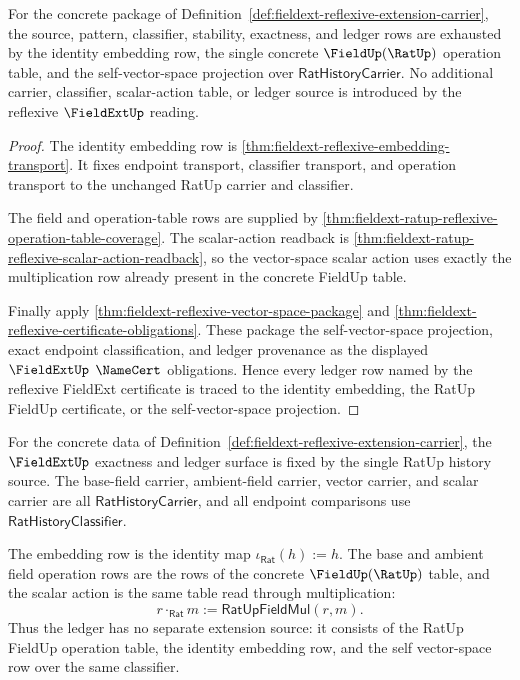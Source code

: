 \begin{theorem}
\label{thm:fieldext-ratup-reflexive-ledger-provenance-coverage}
For the concrete package of
Definition~\ref{def:fieldext-reflexive-extension-carrier}, the source,
pattern, classifier, stability, exactness, and ledger rows are exhausted by the
identity embedding row, the single concrete $\FieldUp(\RatUp)$ operation table,
and the self-vector-space projection over $\mathsf{RatHistoryCarrier}$. No
additional carrier, classifier, scalar-action table, or ledger source is
introduced by the reflexive $\FieldExtUp$ reading.
\end{theorem}
\begin{proof}
The identity embedding row is
\autoref{thm:fieldext-reflexive-embedding-transport}. It fixes endpoint
transport, classifier transport, and operation transport to the unchanged
RatUp carrier and classifier.

The field and operation-table rows are supplied by
\autoref{thm:fieldext-ratup-reflexive-operation-table-coverage}. The
scalar-action readback is
\autoref{thm:fieldext-ratup-reflexive-scalar-action-readback}, so the
vector-space scalar action uses exactly the multiplication row already present
in the concrete FieldUp table.

Finally apply \autoref{thm:fieldext-reflexive-vector-space-package} and
\autoref{thm:fieldext-reflexive-certificate-obligations}. These package the
self-vector-space projection, exact endpoint classification, and ledger
provenance as the displayed $\FieldExtUp$ $\NameCert$ obligations. Hence every
ledger row named by the reflexive FieldExt certificate is traced to the
identity embedding, the RatUp FieldUp certificate, or the self-vector-space
projection.
\end{proof}

\begin{definition}
\label{def:fieldext-reflexive-exactness-ledger-interface}
For the concrete data of
Definition~\ref{def:fieldext-reflexive-extension-carrier}, the
$\FieldExtUp$ exactness and ledger surface is fixed by the single RatUp
history source. The base-field carrier, ambient-field carrier, vector
carrier, and scalar carrier are all $\mathsf{RatHistoryCarrier}$, and all
endpoint comparisons use $\mathsf{RatHistoryClassifier}$.

The embedding row is the identity map
$\iota_{\mathsf{Rat}}(h):=h$. The base and ambient field operation rows are
the rows of the concrete $\FieldUp(\RatUp)$ table, and the scalar action is
the same table read through multiplication:
$$
r\cdot_{\mathsf{Rat}} m :=
\mathsf{RatUpFieldMul}(r,m).
$$
Thus the ledger has no separate extension source: it consists of the RatUp
FieldUp operation table, the identity embedding row, and the self
vector-space row over the same classifier.
\end{definition}

